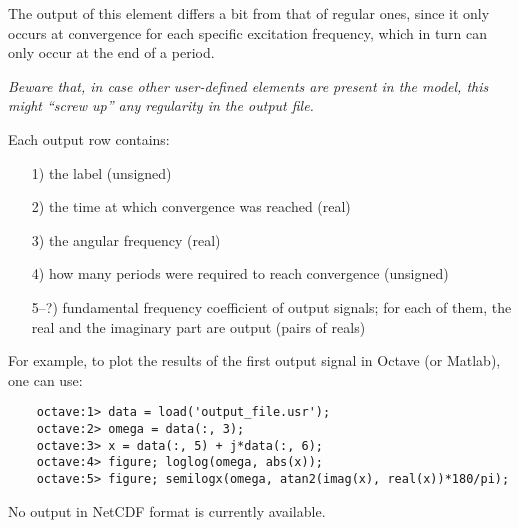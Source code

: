 The output of this element differs a bit from that of regular ones, since it only occurs at convergence for each specific excitation frequency, which in turn can only occur at the end of a period.

\bigskip

\begin{framed}
\noindent
\emph{Beware that, in case other user-defined elements are present in the model, this might ``screw up'' any regularity in the output file.}
\end{framed}

\bigskip

Each output row contains:
\begin{itemize}
\item[1)] the label (unsigned)
\item[2)] the time at which convergence was reached (real)
\item[3)] the angular frequency (real)
\item[4)] how many periods were required to reach convergence (unsigned)
\item[5--?)] fundamental frequency coefficient of output signals; for each of them, the real and the imaginary part are output (pairs of reals)
\end{itemize}
For example, to plot the results of the first output signal in Octave (or Matlab), one can use:
\begin{framed}
\begin{verbatim}
    octave:1> data = load('output_file.usr');
    octave:2> omega = data(:, 3);
    octave:3> x = data(:, 5) + j*data(:, 6);
    octave:4> figure; loglog(omega, abs(x));
    octave:5> figure; semilogx(omega, atan2(imag(x), real(x))*180/pi);
\end{verbatim}
\end{framed}


No output in NetCDF format is currently available.

